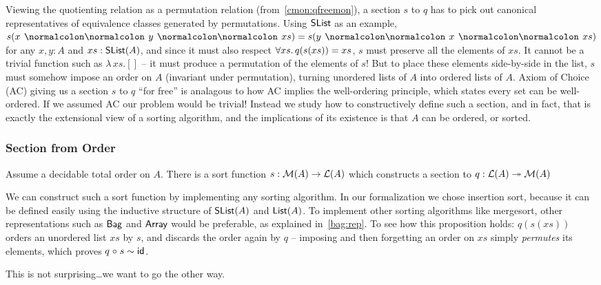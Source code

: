 Viewing the quotienting relation as a permutation relation (from~\cref{cmon:qfreemon}), a section $s$ to $q$ has to pick out
canonical representatives of equivalence classes generated by permutations.
%
Using $\operatorname{\mathsf{SList}}$ as an example, $s(x \cons y \cons xs) \id s(y \cons x \cons xs)$ for any $x, y : A$ and $xs : \operatorname{\mathsf{SList}}(A)$,
and since it must also respect $\forall xs.\,q(s(xs)) \id xs$, $s$ must preserve all the elements of $xs$.
It cannot be a trivial function such as $\lambda\,xs. []$ -- it must produce a permutation of the elements of $s$!
%
But to place these elements side-by-side in the list, $s$ must somehow impose an order on $A$
(invariant under permutation), turning unordered lists of $A$ into ordered lists of $A$.
%
Axiom of Choice (AC) giving us a section $s$ to $q$ ``for free'' is analagous to how
AC implies the well-ordering principle, which states every set can be well-ordered.
%
If we assumed AC our problem would be trivial!
%
Instead we study how to constructively define such a section, and in fact,
that is exactly the extensional view of a sorting algorithm,
and the implications of its existence is that $A$ can be ordered, or sorted.

\subsubsection{Section from Order}

\begin{proposition}
    Assume a decidable total order on $A$. There is a sort function $s: \mathcal{M}(A) \to \mathcal{L}(A)$
    which constructs a section to $q : \mathcal{L}(A) \twoheadrightarrow \mathcal{M}(A)$
\end{proposition}

\begin{proofsketch}
    We can construct such a sort function by implementing any sorting algorithm.
    In our formalization we chose insertion sort,
    because it can be defined easily using the inductive structure of $\operatorname{\mathsf{SList}}(A)$ and $\operatorname{\mathsf{List}}(A)$.
    To implement other sorting algorithms like mergesort,
    other representations such as $\operatorname{\mathsf{Bag}}$ and $\operatorname{\mathsf{Array}}$ would be preferable, as explained in~\cref{bag:rep}.
    To see how this proposition holds: $q(s(xs))$ orders an unordered list $xs$ by $s$,
    and discards the order again by $q$ --
    imposing and then forgetting an order on $xs$ simply \emph{permutes} its elements,
    which proves $q \mathrel{\circ} s \mathrel{\sim} \operatorname{\mathsf{id}}$.
\end{proofsketch}
\noindent
This is not surprising\ldots we want to go the other way.

